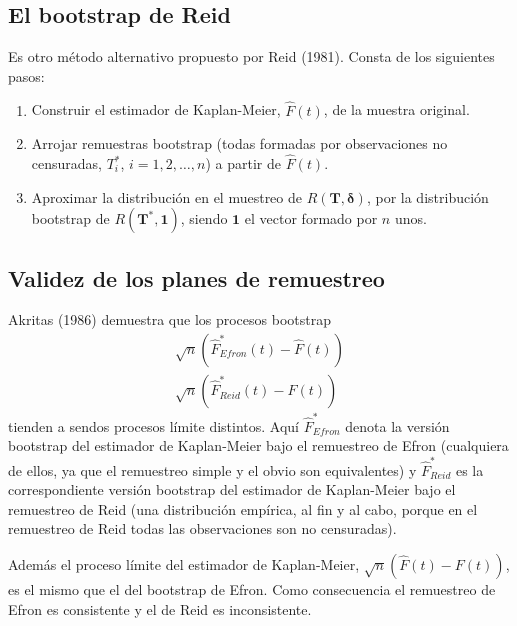 \documentclass[
]{book}
\renewcommand{\boldsymbol}[1]{\symbf{#1}}
\renewcommand{\mathbf}[1]{\symbf{#1}}
\theoremstyle{break}
\theoremstyle{nonumberplain}
\begin{document}
\subsection{El bootstrap de Reid}\label{bootcen-reid}

Es otro método alternativo propuesto por Reid (1981). Consta de los
siguientes pasos:

\begin{enumerate}
\def\labelenumi{\arabic{enumi}.}
\item
  Construir el estimador de Kaplan-Meier, \(\hat{F}\left( t \right)\),
  de la muestra original.
\item
  Arrojar remuestras bootstrap (todas formadas por observaciones no
  censuradas, \(T_i^{\ast}\), \(i=1,2,\ldots ,n\)) a partir de
  \(\hat{F}\left(t \right)\).
\item
  Aproximar la distribución en el muestreo de \(R\left(
  \mathbf{T},\boldsymbol{\delta} \right)\), por la
  distribución bootstrap de
  \(R\left( \mathbf{T}^{\ast},\mathbf{1} \right)\),
  siendo \(\mathbf{1}\) el vector formado
  por \(n\) unos.
\end{enumerate}

\subsection{Validez de los planes de remuestreo}\label{validez-de-los-planes-de-remuestreo}

Akritas (1986) demuestra que los procesos bootstrap
\[\begin{aligned}
\sqrt{n}\left( \hat{F}^{\ast}_{Efron}\left( t \right) 
- \hat{F}\left( t \right) \right) \\ 
\sqrt{n}\left( \hat{F}^{\ast}_{Reid} \left( t \right) 
- \hat{F}\left( t \right) \right)
\end{aligned}\]
tienden a sendos procesos límite distintos. Aquí
\(\hat{F}^{\ast}_{Efron}\) denota la versión bootstrap del estimador
de Kaplan-Meier bajo el remuestreo de Efron (cualquiera de ellos, ya que
el remuestreo simple y el obvio son equivalentes) y
\(\hat{F}^{\ast}_{Reid}\) es la correspondiente versión bootstrap del
estimador de Kaplan-Meier bajo el remuestreo de Reid (una distribución
empírica, al fin y al cabo, porque en el remuestreo de Reid todas las
observaciones son no censuradas).

Además el proceso límite del estimador de Kaplan-Meier, \(\sqrt{n}
\left( \hat{F}\left( t \right) -F\left( t \right) \right)\), es el mismo
que el del bootstrap de Efron. Como consecuencia el remuestreo de Efron
es consistente y el de Reid es inconsistente.
\end{document}
